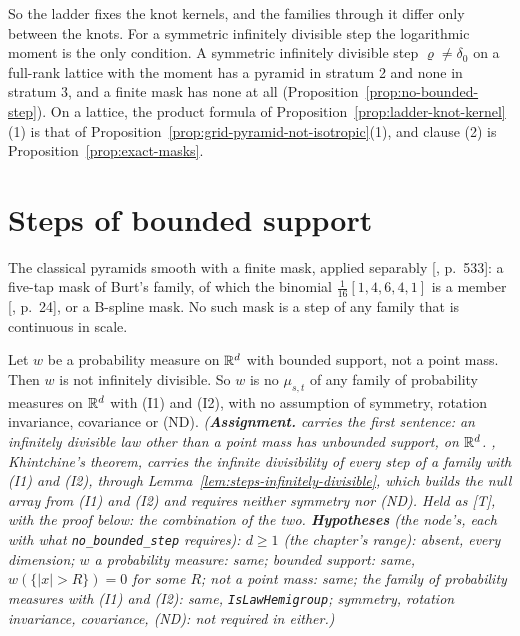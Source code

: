 So the ladder fixes the knot kernels, and the families through it differ only between the knots. For
a symmetric infinitely divisible step the logarithmic moment is the only condition. A symmetric
infinitely divisible step $\varrho \ne \delta_0$ on a full-rank lattice with the moment has a pyramid
in stratum 2 and none in stratum 3, and a finite mask has none at all
(Proposition~\ref{prop:no-bounded-step}). On a lattice, the product formula of
Proposition~\ref{prop:ladder-knot-kernel}(1) is that of
Proposition~\ref{prop:grid-pyramid-not-isotropic}(1), and clause (2) is
Proposition~\ref{prop:exact-masks}.

\section{Steps of bounded support}
\label{sec:pyramid-bounded}

The classical pyramids smooth with a finite mask, applied separably [,
p.~533]: a five-tap mask of Burt's family, of which the binomial $\tfrac1{16}[1,4,6,4,1]$ is a member
[, p.~24], or a B-spline mask. No such mask is a step of any family that is
continuous in scale.

\begin{proposition}
\label{prop:no-bounded-step}
\leanok
{}
Let $w$ be a probability measure on $\mathbb{R}^d$ with bounded support, not a point mass. Then $w$ is not
infinitely divisible. So $w$ is no $\mu_{s,t}$ of any family of probability measures on $\mathbb{R}^d$ with
(I1) and (I2), with no assumption of symmetry, rotation invariance, covariance or (ND).
\statusA\quad{}\quad{}\quad\emph{(\textbf{Assignment.}  carries the
first sentence: an infinitely divisible law other than a point mass has unbounded support, on
$\mathbb{R}^d$. , Khintchine's theorem, carries the infinite divisibility of every step of a
family with (I1) and (I2), through Lemma~\ref{lem:steps-infinitely-divisible}, which builds the
null array from (I1) and (I2) and requires neither symmetry nor (ND). Held as [T], with the proof
below: the combination of the two.
\textbf{Hypotheses} (the node's, each with what \texttt{no\_bounded\_step} requires): $d \ge 1$ (the
chapter's range): absent, every dimension; $w$ a probability measure: same; bounded support: same,
$w(\{|x| > R\}) = 0$ for some $R$; not a point mass: same; the family of probability measures with
(I1) and (I2): same, \texttt{IsLawHemigroup}; symmetry, rotation invariance, covariance, (ND): not
required in either.)}
\end{proposition}

